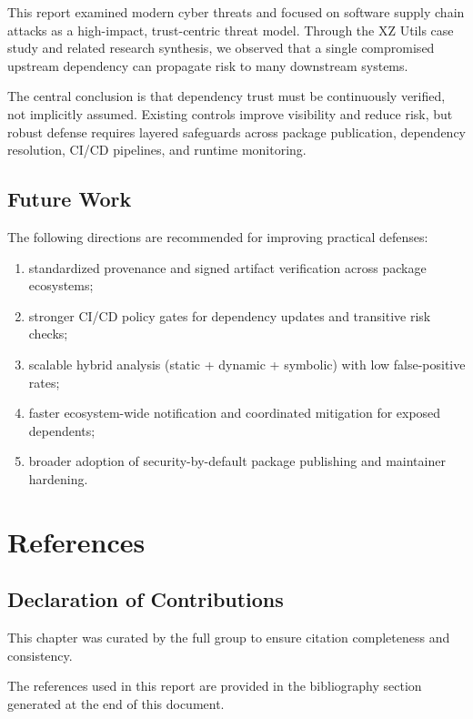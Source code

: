 This report examined modern cyber threats and focused on software supply chain attacks
as a high-impact, trust-centric threat model. Through the XZ Utils case study and related
research synthesis, we observed that a single compromised upstream dependency can propagate
risk to many downstream systems.

The central conclusion is that dependency trust must be continuously verified, not implicitly
assumed. Existing controls improve visibility and reduce risk, but robust defense requires
layered safeguards across package publication, dependency resolution, CI/CD pipelines,
and runtime monitoring.

\section{Future Work}

The following directions are recommended for improving practical defenses:

\begin{enumerate}
\item standardized provenance and signed artifact verification across package ecosystems;
\item stronger CI/CD policy gates for dependency updates and transitive risk checks;
\item scalable hybrid analysis (static + dynamic + symbolic) with low false-positive rates;
\item faster ecosystem-wide notification and coordinated mitigation for exposed dependents;
\item broader adoption of security-by-default package publishing and maintainer hardening.
\end{enumerate}

\chapter{References}
\label{ch:references-note}

\section*{Declaration of Contributions}
This chapter was curated by the full group to ensure citation completeness and consistency.

The references used in this report are provided in the bibliography section generated at the
end of this document.
